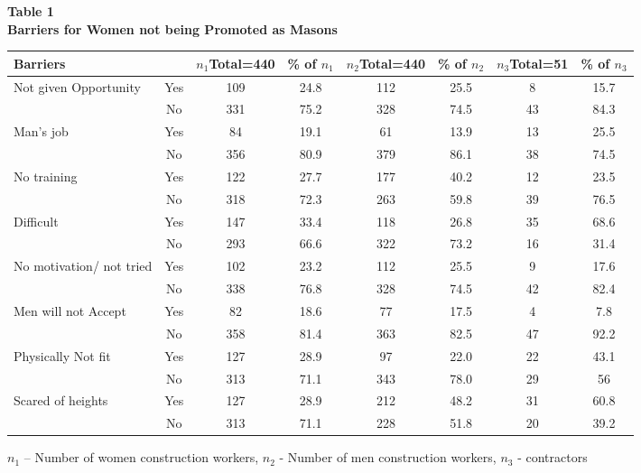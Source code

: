 \documentclass[12pt]{report}
\newcommand{\bt}[1]{\textbf{#1}}
\newcommand{\sps}{\\[0.2cm]}
\begin{document}
	\bt{Table 1}\\
	\bt{Barriers for Women not being Promoted as Masons}
	\begin{longtable}{p{}c@{\hskip 0.06in}c@{\hskip 0.07in}c@{\hskip 0.08in}c@{\hskip 0.07in}c@{\hskip 0.08in}c@{\hskip 0.08in}c}
			\hline
			\bt{Barriers} & &$n_1${\footnotesize Total=440} & {\footnotesize\% of }$n_1$   &    $n_2${\footnotesize Total=440}  & {\footnotesize\% of }$n_2$   & $n_3${\footnotesize Total=51}  & {\footnotesize\% of }$n_3$\\ \hline
			\multirow{2}{=}{Not given Opportunity}  & Yes & 109 & 24.8 & 112 & 25.5 & 8 &15.7 \\
						& No & 331 & 75.2 & 328 & 74.5 & 43  & 84.3 \\ \hline
			\multirow{2}{=}{Man's job} & Yes & 84 & 19.1 & 61 & 13.9 & 13 & 25.5\\
						&No & 356 & 80.9 & 379 & 86.1 & 38 & 74.5 \\ \hline
			\multirow{2}{=}{No training} & Yes & 122 & 27.7  & 177 & 40.2 & 12 & 23.5\\
						& No & 318 & 72.3 & 263 & 59.8 & 39 & 76.5\\ \hline
			\multirow{2}{=}{Difficult} & Yes & 147 & 33.4 & 118 & 26.8 & 35 & 68.6\\
						&No & 293 & 66.6 & 322 & 73.2 & 16 & 31.4\\ \hline		
			\multirow{2}{=}{No motivation/ not tried} & Yes & 102  & 23.2 &  112 & 25.5 & 9 &  17.6\\
					&No & 338 & 76.8 & 328 & 74.5  & 42 & 82.4 \\ \hline
			\multirow{2}{=}{Men will not Accept} & Yes & 82 & 18.6 & 77 & 17.5  & 4 &  7.8\\
					& No & 358 & 81.4 & 363 & 82.5 & 47 & 92.2\\ \hline
			\multirow{2}{=}{Physically Not fit} & Yes & 127 & 28.9  & 97 & 22.0 & 22 & 43.1\\
						& No & 313 & 71.1 & 343 & 78.0 & 29 & 56\\ \hline
			\multirow{2}{=}{Scared of heights} & Yes & 127 & 28.9 & 212  & 48.2 & 31 & 60.8\\
						& No & 313 & 71.1 & 228 & 51.8 & 20 & 39.2\\ \hline
	\end{longtable}
	$n_1$ – Number of women construction workers, $n_2$ - Number of men construction workers, $n_3$ - contractors\sps
	
\end{document}

